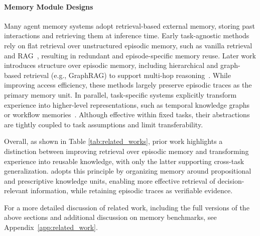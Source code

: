 \paragraph{Memory Module Designs}

Many agent memory systems adopt retrieval-based external memory, storing past interactions and retrieving them at inference time. Early task-agnostic methods rely on flat retrieval over unstructured episodic memory, such as vanilla retrieval and RAG~\citep{lewis2021retrievalaugmentedgenerationknowledgeintensivenlp,Wang_2024}, resulting in redundant and episode-specific memory reuse. Later work introduces structure over episodic memory, including hierarchical and graph-based retrieval (e.g., GraphRAG) to support multi-hop reasoning~\citep{edge2025localglobalgraphrag,sarthi2024raptorrecursiveabstractiveprocessing,gutiérrez2025ragmemorynonparametriccontinual,Wang_2025}. While improving access efficiency, these methods largely preserve episodic traces as the primary memory unit.
In parallel, task-specific systems explicitly transform experience into higher-level representations, such as temporal knowledge graphs or workflow memories~\citep{gutiérrez2025ragmemorynonparametriccontinual,wang2024agentworkflowmemory,ouyang2025reasoningbankscalingagentselfevolving}. Although effective within fixed tasks, their abstractions are tightly coupled to task assumptions and limit transferability.

Overall, as shown in Table \ref{tab:related_works}, prior work highlights a distinction between improving retrieval over episodic memory and transforming experience into reusable knowledge, with only the latter supporting cross-task generalization. \plugmem adopts this principle by organizing memory around propositional and prescriptive knowledge units, enabling more effective retrieval of decision-relevant information, while retaining episodic traces as verifiable evidence.

For a more detailed discussion of related work, including the full versions of the above sections
and additional discussion on memory benchmarks, see Appendix~\ref{app:related_work}.
